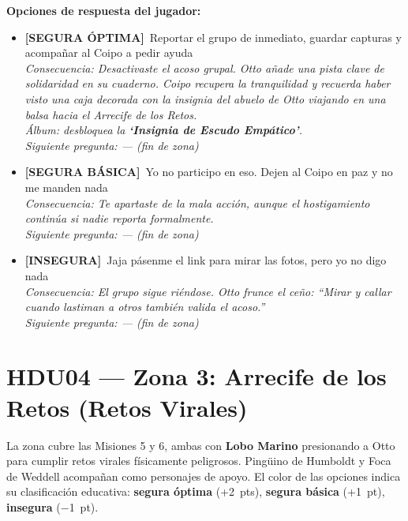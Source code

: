 \documentclass[12pt,a4paper]{article}
\newcommand{\segoptima}[1]{\item[\textcolor{segura}{$\bullet$}] \textcolor{segura}{\textbf{[SEGURA ÓPTIMA]}~#1}}
\newcommand{\segbasica}[1]{\item[\textcolor{basica}{$\bullet$}] \textcolor{basica}{\textbf{[SEGURA BÁSICA]}~#1}}
\newcommand{\inseg}[1]{\item[\textcolor{insegura}{$\bullet$}] \textcolor{insegura}{\textbf{[INSEGURA]}~#1}}
\begin{document}
\medskip
\noindent\textbf{Opciones de respuesta del jugador:}

\begin{itemize}[leftmargin=1.5cm]
  \segoptima{Reportar el grupo de inmediato, guardar capturas y acompañar al Coipo a pedir ayuda}
  \\ \textit{Consecuencia: Desactivaste el acoso grupal. Otto añade una pista clave de solidaridad en su cuaderno. Coipo recupera la tranquilidad y recuerda haber visto una caja decorada con la insignia del abuelo de Otto viajando en una balsa hacia el Arrecife de los Retos.}
  \\ \textit{Álbum: desbloquea la \textbf{`Insignia de Escudo Empático'}.}
  \\ \textit{Siguiente pregunta: --- (fin de zona)}

  \segbasica{Yo no participo en eso. Dejen al Coipo en paz y no me manden nada}
  \\ \textit{Consecuencia: Te apartaste de la mala acción, aunque el hostigamiento continúa si nadie reporta formalmente.}
  \\ \textit{Siguiente pregunta: --- (fin de zona)}

  \inseg{Jaja pásenme el link para mirar las fotos, pero yo no digo nada}
  \\ \textit{Consecuencia: El grupo sigue riéndose. Otto frunce el ceño: ``Mirar y callar cuando lastiman a otros también valida el acoso.''}
  \\ \textit{Siguiente pregunta: --- (fin de zona)}
\end{itemize}

\newpage
\section{HDU04 --- Zona 3: Arrecife de los Retos (Retos Virales)}

La zona cubre las Misiones 5 y 6, ambas con \textbf{Lobo Marino} presionando a Otto para
cumplir retos virales físicamente peligrosos. Pingüino de Humboldt y Foca de Weddell
acompañan como personajes de apoyo.
El color de las opciones indica su clasificación educativa:
{\color{segura}\textbf{segura óptima}} (+2~pts),
{\color{basica}\textbf{segura básica}} (+1~pt),
{\color{insegura}\textbf{insegura}} ($-$1~pt).

\end{document}
